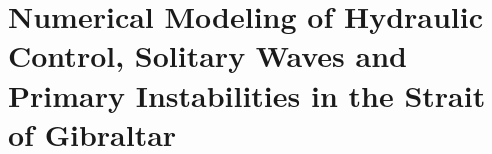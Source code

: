 


%

%






%

%

\section{Numerical Modeling of Hydraulic Control, Solitary Waves and Primary Instabilities in the Strait of Gibraltar}
\label{sectionSim2D}

